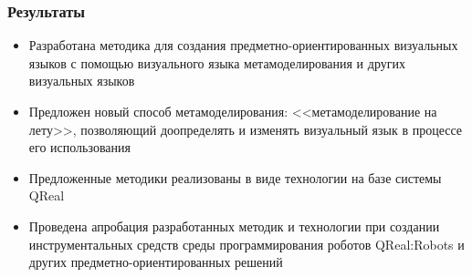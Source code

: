 \documentclass[14pt]{beamer}
\begin{document}
\begin{frame}
    \frametitle{Результаты}
    \begin{itemize}
        \small
        \item Разработана методика для создания предметно-ориентированных визуальных
        языков с помощью визуального языка метамоделирования и других визуальных
        языков
        \item Предложен новый способ метамоделирования: <<метамоделирование на лету>>,
        позволяющий доопределять и изменять визуальный язык в процессе его
        использования
        \item Предложенные методики реализованы в виде технологии на базе системы
        QReal
        \item Проведена апробация разработанных методик и технологии при создании
        инструментальных средств среды программирования роботов QReal:Robots и
        других предметно-ориентированных решений
    \end{itemize}
\end{frame}
\end{document}
